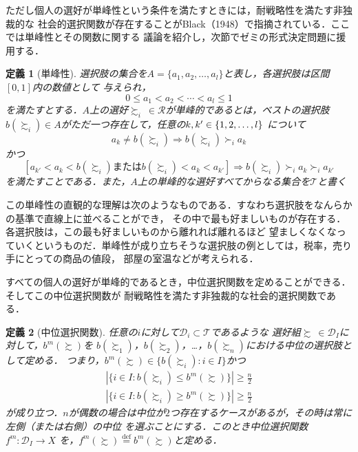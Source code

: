 \documentclass[dvipdfmx]{jsarticle}
\newtheorem{definition}{定義}[section]
\begin{document}
ただし個人の選好が単峰性という条件を満たすときには，耐戦略性を満たす非独裁的な
社会的選択関数が存在することがBlack（1948）で指摘されている．ここでは単峰性とその関数に関する
議論を紹介し，次節でゼミの形式決定問題に援用する．

\begin{definition}[単峰性]
  選択肢の集合を$A = \{a_1, a_2, \ldots, a_{l}\}$と表し，各選択肢は区間$[0,1]$内の数値として
  与えられ，
  \[
    0 \leq a_1 < a_2 < \cdots < a_{l} \leq 1
  \]
  を満たすとする．$A$上の選好$\succsim_i \ \in \mathcal{R}$が単峰的であるとは，ベストの選択肢
  $b(\succsim_i) \in A$がただ一つ存在して，任意の$k, k' \in \{ 1, 2, \ldots, \mathnormal{l} \}$
  について
  \[
    a_k \neq b(\succsim_i) \Rightarrow b(\succsim_i) \succ_i a_k
  \]
  かつ
  \[
    [a_{k'} < a_{k} < b(\succsim_i) \text{または} b(\succsim_i) < a_{k} < a_{k'}]
    \Rightarrow b(\succsim_i) \succ_i a_{k} \succ_i a_{k'}
  \]
  を満たすことである．また，$A$上の単峰的な選好すべてからなる集合を$\mathcal{T}$と書く
\end{definition}

この単峰性の直観的な理解は次のようなものである．すなわち選択肢をなんらかの基準で直線上に並べることができ，
その中で最も好ましいものが存在する．各選択肢は，この最も好ましいものから離れれば離れるほど
望ましくなくなっていくというものだ．単峰性が成り立ちそうな選択肢の例としては，税率，売り手にとっての商品の値段，
部屋の室温などが考えられる．

すべての個人の選好が単峰的であるとき，中位選択関数を定めることができる．そしてこの中位選択関数が
耐戦略性を満たす非独裁的な社会的選択関数である．

\begin{definition}[中位選択関数]
  任意の$i$に対して$\mathcal{D}_i \subset \mathcal{T}$であるような
  選好組$\succsim \ \in \mathcal{D}_I$に対して，$b^m(\succsim)$を
  $b(\succsim_1)$，$b(\succsim_2)$，\ldots，$b(\succsim_n)$における中位の選択肢として定める．
  つまり，$b^m(\succsim) \in \{ b(\succsim_i):i \in I \}$かつ
  \begin{eqnarray*}
    | \{i \in I: b(\succsim_i) \leq b^m(\succsim) \} | \geq \frac{n}{2} \\
    | \{i \in I: b(\succsim_i) \geq b^m(\succsim) \} | \geq \frac{n}{2}
  \end{eqnarray*}
  が成り立つ．$n$が偶数の場合は中位が$2$つ存在するケースがあるが，その時は常に左側（または右側）の中位
  を選ぶことにする．このとき中位選択関数$f^m\colon \mathcal{D}_{I} \to X$
  を，$f^m(\succsim) \stackrel{\mathrm{def}}{=} b^m(\succsim)$と定める．
\end{definition}
\end{document}
